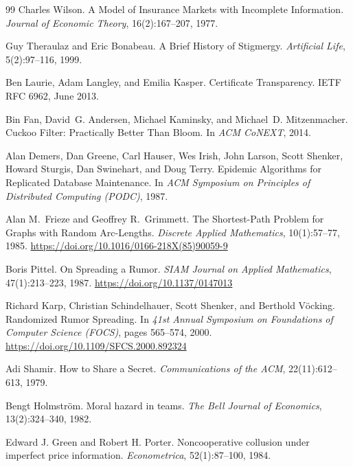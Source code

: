 \documentclass[11pt,a4paper]{article}
\theoremstyle{definition}
\theoremstyle{remark}
\begin{document}
\begin{thebibliography}{99}
Charles Wilson.
\newblock A Model of Insurance Markets with Incomplete Information.
\newblock \textit{Journal of Economic Theory}, 16(2):167--207, 1977.

Guy Theraulaz and Eric Bonabeau.
\newblock A Brief History of Stigmergy.
\newblock \textit{Artificial Life}, 5(2):97--116, 1999.

Ben Laurie, Adam Langley, and Emilia Kasper.
\newblock Certificate Transparency.
\newblock IETF RFC 6962, June 2013.

Bin Fan, David~G. Andersen, Michael Kaminsky, and Michael~D. Mitzenmacher.
\newblock Cuckoo Filter: Practically Better Than Bloom.
\newblock In \textit{ACM CoNEXT}, 2014.

Alan Demers, Dan Greene, Carl Hauser, Wes Irish, John Larson, Scott Shenker, Howard Sturgis, Dan Swinehart, and Doug Terry.
\newblock Epidemic Algorithms for Replicated Database Maintenance.
\newblock In \textit{ACM Symposium on Principles of Distributed Computing (PODC)}, 1987.

Alan M.\ Frieze and Geoffrey R.\ Grimmett.
\newblock The Shortest-Path Problem for Graphs with Random Arc-Lengths.
\newblock \textit{Discrete Applied Mathematics}, 10(1):57--77, 1985.
\newblock \url{https://doi.org/10.1016/0166-218X(85)90059-9}

Boris Pittel.
\newblock On Spreading a Rumor.
\newblock \textit{SIAM Journal on Applied Mathematics}, 47(1):213--223, 1987.
\newblock \url{https://doi.org/10.1137/0147013}

Richard Karp, Christian Schindelhauer, Scott Shenker, and Berthold V\"ocking.
\newblock Randomized Rumor Spreading.
\newblock In \textit{41st Annual Symposium on Foundations of Computer Science (FOCS)}, pages 565--574, 2000.
\newblock \url{https://doi.org/10.1109/SFCS.2000.892324}

Adi Shamir.
\newblock How to Share a Secret.
\newblock \textit{Communications of the ACM}, 22(11):612--613, 1979.

Bengt Holmstr\"om.
\newblock Moral hazard in teams.
\newblock \textit{The Bell Journal of Economics}, 13(2):324--340, 1982.

Edward J. Green and Robert H. Porter.
\newblock Noncooperative collusion under imperfect price information.
\newblock \textit{Econometrica}, 52(1):87--100, 1984.


\end{thebibliography}
\end{document}
